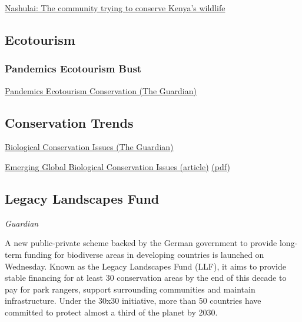\documentclass[
]{book}
\begin{document}
\href{https://www.bbc.com/news/av/world-africa-55477272}{Nashulai: The community trying to conserve Kenya's wildlife}

\hypertarget{ecotourism}{%
\subsection{Ecotourism}\label{ecotourism}}

\hypertarget{pandemics-ecotourism-bust}{%
\subsubsection{Pandemics Ecotourism Bust}\label{pandemics-ecotourism-bust}}

\href{https://www.theguardian.com/environment/2020/dec/30/a-critical-time-how-covid-19-put-the-natural-world-under-pressure-in-2020-aoe}{Pandemics Ecotourism Conservation (The Guardian)}

\hypertarget{conservation-trends}{%
\subsection{Conservation Trends}\label{conservation-trends}}

\href{https://www.theguardian.com/environment/2020/dec/28/seabird-patrols-to-self-healing-buildings-the-15-conservation-stories-to-watch-in-2021}{Biological Conservation Issues (The Guardian)}

\href{https://www.cell.com/trends/ecology-evolution/fulltext/S0169-5347(20)30306-2}{Emerging Global Biological Conservation Issues (article)}
\href{/pdf/Sutherland_2020_Horizon_Scan_Biological_Conservation_Issues.pdf}{(pdf)}

\hypertarget{legacy-landscapes-fund}{%
\subsection{Legacy Landscapes Fund}\label{legacy-landscapes-fund}}

\emph{Guardian}

A new public-private scheme backed by the German government to provide long-term funding for biodiverse areas in developing countries is launched on Wednesday. Known as the Legacy Landscapes Fund (LLF), it aims to provide stable financing for at least 30 conservation areas by the end of this decade to pay for park rangers, support surrounding communities and maintain infrastructure. Under the 30x30 initiative, more than 50 countries have committed to protect almost a third of the planet by 2030.
\end{document}

